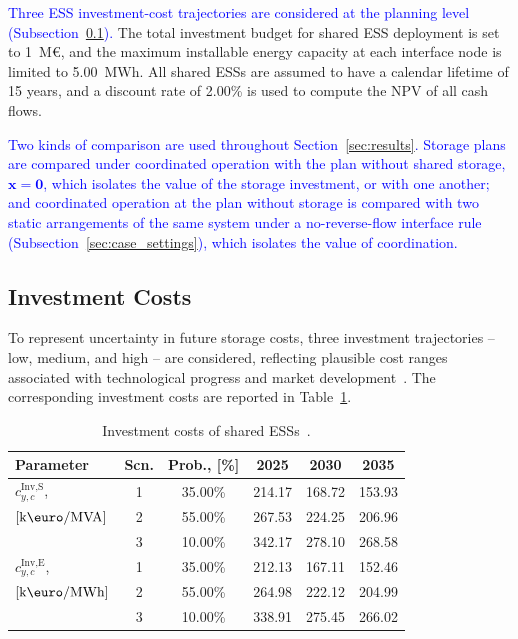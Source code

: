 \documentclass[preprint,12pt]{elsarticle}
\begin{document}
\textcolor{blue}{
    Three ESS investment-cost trajectories are considered at the planning level (Subsection~\ref{subsec:case_investment_costs}).
}
The total investment budget for shared ESS deployment is set to 1~M\euro, and the maximum installable energy capacity at each interface node is limited to 5.00~MWh. All shared ESSs are assumed to have a calendar lifetime of 15 years, and a discount rate of 2.00\% is used to compute the NPV of all cash flows.

\textcolor{blue}{
    Two kinds of comparison are used throughout Section~\ref{sec:results}. Storage plans are compared under coordinated operation with the plan without shared storage, $\boldsymbol{x} = \boldsymbol{0}$, which isolates the value of the storage investment, or with one another; and coordinated operation at the plan without storage is compared with two static arrangements of the same system under a no-reverse-flow interface rule (Subsection~\ref{sec:case_settings}), which isolates the value of coordination.
}

\subsection{Investment Costs}
\label{subsec:case_investment_costs}

To represent uncertainty in future storage costs, three investment trajectories -- low, medium, and high -- are considered, reflecting plausible cost ranges associated with technological progress and market development~\cite{nrel_ess_costs,iea_ess_2024}. The corresponding investment costs are reported in Table~\ref{tab:investment_cost}.

\begin{table}[htbp!]
    \centering
    \caption{Investment costs of shared ESSs~\cite{nrel_ess_costs}.}
    \begin{tabular}{lcc ccc}
        \toprule
        Parameter & Scn. & Prob., [\%] & 2025 & 2030 & 2035 \\ 
        \midrule
        $c^\text{Inv,S}_{y,c}$,     & 1 & 35.00\% & 214.17 & 168.72 & 153.93\\
        $\left[\text{k\euro/MVA}\right]$ & 2 & 55.00\% & 267.53 & 224.25 & 206.96\\
        ~                           & 3 & 10.00\% & 342.17 & 278.10 & 268.58\\
        \midrule
        $c^\text{Inv,E}_{y,c}$, & 1 & 35.00\% & 212.13 & 167.11 & 152.46\\
        $\left[\text{k\euro/MWh}\right]$ & 2 & 55.00\% & 264.98 & 222.12 & 204.99\\
        ~                           & 3 & 10.00\% & 338.91 & 275.45 & 266.02\\
        \bottomrule
    \end{tabular}
    \label{tab:investment_cost}
\end{table}
\end{document}
